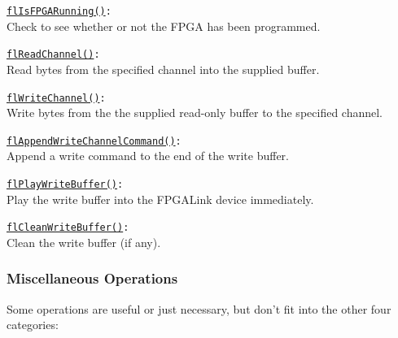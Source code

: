 \begin{desc}
  \item[\texttt{\href{http://www.swaton.ukfsn.org/apidocs/libfpgalink\_8h.html\#ae9a64e022ac9607d71d9b7de80508b12}{flIsFPGARunning()}:}] \hfill \\
    Check to see whether or not the FPGA has been programmed.
  \item[\texttt{\href{http://www.swaton.ukfsn.org/apidocs/libfpgalink\_8h.html\#a0478f3526c4cdaadb844288b7e60e949}{flReadChannel()}:}] \hfill \\
    Read bytes from the specified channel into the supplied buffer.
  \item[\texttt{\href{http://www.swaton.ukfsn.org/apidocs/libfpgalink\_8h.html\#ac2b8dfb0a19a357a28af9986e6a50966}{flWriteChannel()}:}] \hfill \\
    Write bytes from the the supplied read-only buffer to the specified channel.
  \item[\texttt{\href{http://www.swaton.ukfsn.org/apidocs/libfpgalink\_8h.html\#a92ca0a05d4c363a3e9444e1b9dc9b8fa}{flAppendWriteChannelCommand()}:}] \hfill \\
    Append a write command to the end of the write buffer.
  \item[\texttt{\href{http://www.swaton.ukfsn.org/apidocs/libfpgalink\_8h.html\#a0cbf4cd4df8c8cee73a70022b3467499}{flPlayWriteBuffer()}:}] \hfill \\
    Play the write buffer into the FPGALink device immediately.
  \item[\texttt{\href{http://www.swaton.ukfsn.org/apidocs/libfpgalink\_8h.html\#a36644c7d3ec966f4983dd8d17a9b2dc4}{flCleanWriteBuffer()}:}] \hfill \\
    Clean the write buffer (if any).
\end{desc}

\subsubsection{Miscellaneous Operations}
Some operations are useful or just necessary, but don't fit into the other four categories: 

